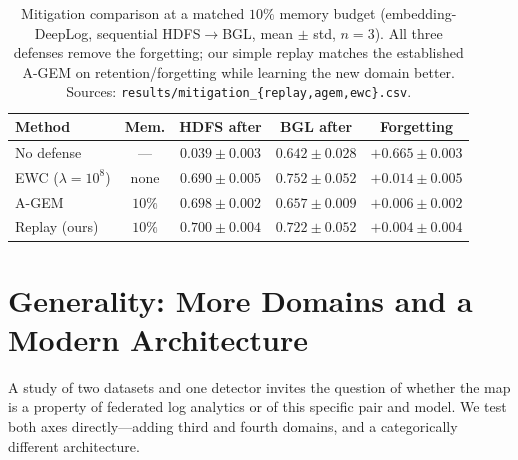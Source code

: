 \documentclass[journal]{IEEEtran}
\begin{document}
\begin{table}[t]
\caption{Mitigation comparison at a matched $10\%$ memory budget (embedding-DeepLog, sequential
HDFS$\rightarrow$BGL, mean $\pm$ std, $n=3$). All three defenses remove the forgetting; our simple
replay matches the established A-GEM on retention/forgetting while learning the new domain better.
Sources: \texttt{results/mitigation\_\{replay,agem,ewc\}.csv}.}
\label{tab:baselines}
\centering
\begin{tabular}{@{}lcccc@{}}
\toprule
Method & Mem. & HDFS after & BGL after & Forgetting \\
\midrule
No defense               & ---   & $0.039\pm0.003$ & $0.642\pm0.028$ & $+0.665\pm0.003$ \\
EWC ($\lambda{=}10^{8}$) & none  & $0.690\pm0.005$ & $\mathbf{0.752\pm0.052}$ & $+0.014\pm0.005$ \\
A-GEM~\cite{agem2019}    & $10\%$ & $0.698\pm0.002$ & $0.657\pm0.009$ & $+0.006\pm0.002$ \\
Replay (ours)            & $10\%$ & $\mathbf{0.700\pm0.004}$ & $0.722\pm0.052$ & $\mathbf{+0.004\pm0.004}$ \\
\bottomrule
\end{tabular}
\end{table}

\section{Generality: More Domains and a Modern Architecture}\label{sec:generality}
A study of two datasets and one detector invites the question of whether the map is a property of
federated log analytics or of this specific pair and model. We test both axes directly---adding third
and fourth domains, and a categorically different architecture.
\end{document}
